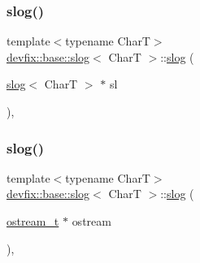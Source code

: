\subsubsection{\texorpdfstring{slog()}{slog()}\hspace{0.1cm}{\footnotesize\ttfamily [1/5]}}
{\footnotesize\ttfamily template$<$typename CharT$>$ \\
\hyperlink{structdevfix_1_1base_1_1slog}{devfix\+::base\+::slog}$<$ CharT $>$\+::\hyperlink{structdevfix_1_1base_1_1slog}{slog} (\begin{DoxyParamCaption}\item[{\hyperlink{structdevfix_1_1base_1_1slog}{slog}$<$ CharT $>$ $\ast$}]{sl }\end{DoxyParamCaption})\hspace{0.3cm}{\ttfamily [inline]}, {\ttfamily [explicit]}}

\mbox{\label{structdevfix_1_1base_1_1slog_a240d2ff14130c8a4ab8b25705a08fbe9}} 
\subsubsection{\texorpdfstring{slog()}{slog()}\hspace{0.1cm}{\footnotesize\ttfamily [2/5]}}
{\footnotesize\ttfamily template$<$typename CharT$>$ \\
\hyperlink{structdevfix_1_1base_1_1slog}{devfix\+::base\+::slog}$<$ CharT $>$\+::\hyperlink{structdevfix_1_1base_1_1slog}{slog} (\begin{DoxyParamCaption}\item[{\hyperlink{structdevfix_1_1base_1_1slog_a3602226e6adc9ea19626e25a0df085a6}{ostream\+\_\+t} $\ast$}]{ostream }\end{DoxyParamCaption})\hspace{0.3cm}{\ttfamily [inline]}, {\ttfamily [explicit]}}

\mbox{\label{structdevfix_1_1base_1_1slog_a13059c5e76ff1647b9a397a868879708}} 
